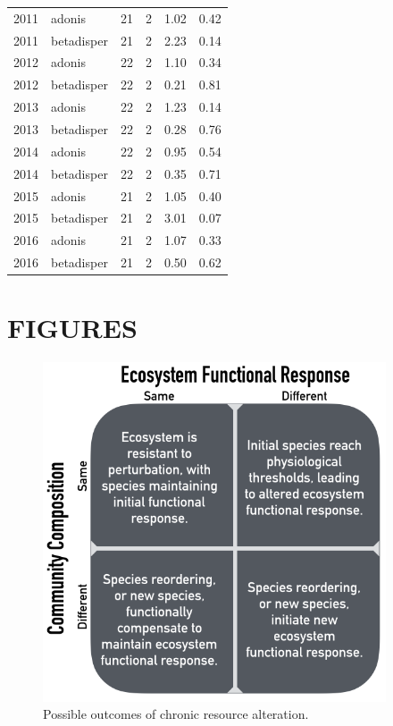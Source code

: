 \documentclass[fleqn,10pt,lineno]{wlpeerj} %
\begin{document}
\begin{table}[ht]
\begin{tabular}{rlrrrr}
2011 & adonis &  21 &   2 & 1.02 & 0.42 \\ 
  2011 & betadisper &  21 &   2 & 2.23 & 0.14 \\ 
  2012 & adonis &  22 &   2 & 1.10 & 0.34 \\ 
  2012 & betadisper &  22 &   2 & 0.21 & 0.81 \\ 
  2013 & adonis &  22 &   2 & 1.23 & 0.14 \\ 
  2013 & betadisper &  22 &   2 & 0.28 & 0.76 \\ 
  2014 & adonis &  22 &   2 & 0.95 & 0.54 \\ 
  2014 & betadisper &  22 &   2 & 0.35 & 0.71 \\ 
  2015 & adonis &  21 &   2 & 1.05 & 0.40 \\ 
  2015 & betadisper &  21 &   2 & 3.01 & 0.07 \\ 
  2016 & adonis &  21 &   2 & 1.07 & 0.33 \\ 
  2016 & betadisper &  21 &   2 & 0.50 & 0.62 \\ 
   \hline
\end{tabular}
\endgroup
\end{table}

\newpage{}

\section{FIGURES}\label{figures}

\begin{figure}[!ht]
  \centering
      \includegraphics[width=4in]{../figures/hypothesis_figtable.png}
  \caption{Possible outcomes of chronic resource alteration.}
\end{figure}
\end{document}
